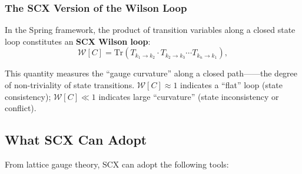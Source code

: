 \documentclass[12pt,a4paper]{article}
\theoremstyle{remark}
\newcommand{\Tr}{\mathrm{Tr}}
\begin{document}
\subsubsection{The SCX Version of the Wilson Loop}

In the Spring framework, the product of transition variables along a closed state loop
constitutes an \textbf{SCX Wilson loop}:
\begin{equation}
    \mathcal{W}[C] = \Tr\left(T_{k_1 \to k_2} \cdot T_{k_2 \to k_3} \cdots
    T_{k_n \to k_1}\right),
\end{equation}

This quantity measures the ``gauge curvature'' along a closed path——the degree of non-triviality of state transitions.
$\mathcal{W}[C] \approx 1$ indicates a ``flat'' loop (state consistency);
$\mathcal{W}[C] \ll 1$ indicates large ``curvature'' (state inconsistency or conflict).

\subsection{What SCX Can Adopt}

From lattice gauge theory, SCX can adopt the following tools:
\end{document}
